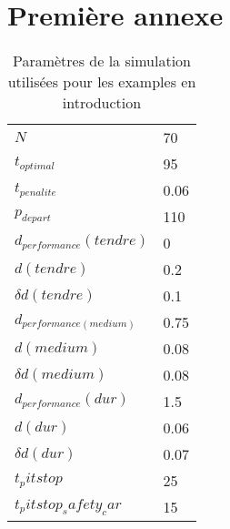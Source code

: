 \documentclass[
    iict, %
    il, %
]{heig-tb}
\begin{document}
\chapter{Première annexe}
\begin{table}[H]
    \begin{center}
        \caption{\label{Paramètres de la simulation}Paramètres de la simulation utilisées pour les examples en introduction}
        \begin{tabular}{l|l}
            $N$                                & 70   \\
            $t_{optimal}$                      & 95   \\
            $t_{penalite}$                     & 0.06 \\
            $p_{depart}$                       & 110  \\
            $d_{per\textit{f}ormance}(tendre)$ & 0    \\
            $d(tendre)$                        & 0.2  \\
            $\delta{d(tendre)}$                & 0.1  \\
            $d_{per\textit{f}ormance(medium)}$ & 0.75 \\
            $d(medium)$                        & 0.08 \\
            $\delta{d(medium)}$                & 0.08 \\
            $d_{per\textit{f}ormance}(dur)$    & 1.5  \\
            $d(dur)$                           & 0.06 \\
            $\delta{d(dur)}$                   & 0.07 \\
            $t_pitstop$                        & 25   \\
            $t_pitstop_safety_car$             & 15   \\
        \end{tabular}
    \end{center}
\end{table}
\end{document}

